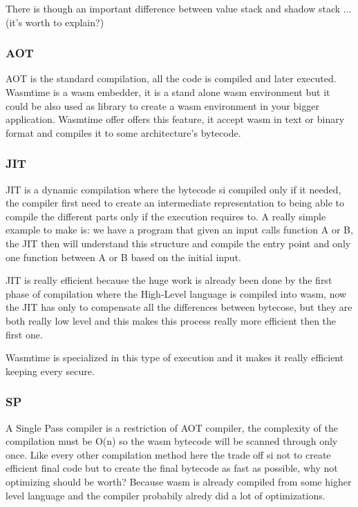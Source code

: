 \documentclass[../main.tex]{subfiles}
\begin{document}
There is though an important difference between value stack and shadow stack ... (it's worth to explain?)

\subsubsection{AOT}

AOT is the standard compilation, all the code is compiled and later executed. Wasmtime is a wasm embedder, it is a stand alone wasm environment but it could be also used as library to create a wasm environment in your bigger application. Wasmtime offer offers this feature, it accept wasm in text or binary format and compiles it to some architecture's bytecode.

\subsubsection{JIT}

JIT is a dynamic compilation where the bytecode si compiled only if it needed, the compiler first need to create an intermediate representation to being able to compile the different parts only if the execution requires to. A really simple example to make is: we have a program that given an input calls function A or B, the JIT then will understand this structure and compile the entry point and only one function between A or B based on the initial input.

JIT is really efficient because the huge work is already been done by the first phase of compilation where the High-Level language is compiled into wasm, now the JIT has only to compensate all the differences between bytecose, but they are both really low level and this makes this process really more efficient then the first one.

Wasmtime is specialized in this type of execution and it makes it really efficient keeping every secure.

\subsubsection{SP} %

A Single Pass compiler is a restriction of AOT compiler, the complexity of the compilation must be O(n) so the wasm bytecode will be scanned through only once. Like every other compilation method here the trade off si not to create efficient final code but to create the final bytecode as fast as possible, why not optimizing should be worth? Because wasm is already compiled from some higher level language and the compiler probabily alredy did a lot of optimizations.
\end{document}
